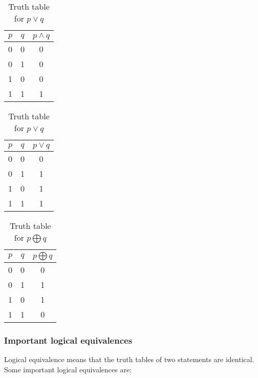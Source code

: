 \documentclass[14pt]{extarticle}
\newcommand{\xor}{\bigoplus}
\begin{document}
\begin{table}[ht]
\centering
\begin{minipage}{0.45\textwidth}
  \centering
  \begin{tabular}{|c|c|c|}
    \hline
    $p$ & $q$ & $p \land q$ \\
    \hline
    0 & 0 & 0 \\
    0 & 1 & 0 \\
    1 & 0 & 0 \\
    1 & 1 & 1 \\
    \hline
  \end{tabular}
  \caption{Truth table for $p \land q$}
  \label{tab:first}
\end{minipage}%
\hspace{0.05\textwidth} %
\begin{minipage}{0.45\textwidth}
  \centering
  \begin{tabular}{|c|c|c|}
    \hline
    $p$ & $q$ & $p \lor q$ \\
    \hline
    0 & 0 & 0 \\
    0 & 1 & 1 \\
    1 & 0 & 1 \\
    1 & 1 & 1 \\
    \hline
  \end{tabular}
  \caption{Truth table for $p \lor q$}
  \label{tab:second}
\end{minipage}
\end{table}

\begin{table}[ht]
    \centering
    \begin{tabular}{|c|c|c|}
        \hline
        $p$ & $q$ & $p \xor q$ \\
        \hline
        0 & 0 & 0 \\
        0 & 1 & 1 \\
        1 & 0 & 1 \\
        1 & 1 & 0 \\
        \hline
    \end{tabular}
    \caption{Truth table for $p \xor q$}
    \label{tab:third}
\end{table}

\subsubsection{Important logical equivalences}
Logical equivalence means that the truth tables of two statements are identical.
Some important logical equivalences are:
\end{document}
